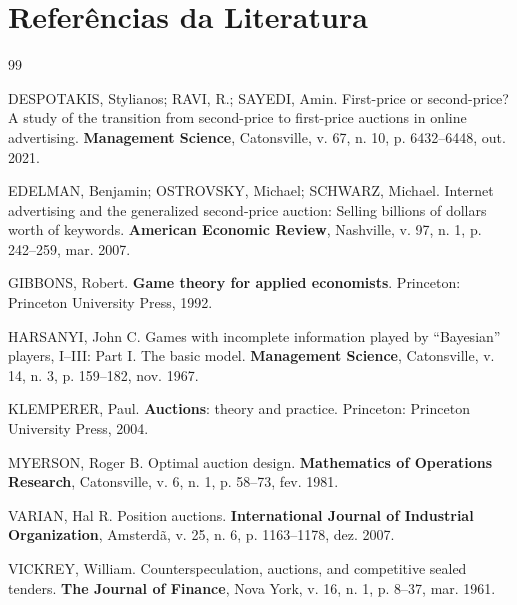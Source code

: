 \section{Referências da Literatura}
\label{sec:referencias}

\renewcommand{\refname}{}

\begin{thebibliography}{99}

DESPOTAKIS, Stylianos; RAVI, R.; SAYEDI, Amin. First-price or second-price? A study of the transition from second-price to first-price auctions in online advertising. \textbf{Management Science}, Catonsville, v. 67, n. 10, p. 6432--6448, out. 2021.

EDELMAN, Benjamin; OSTROVSKY, Michael; SCHWARZ, Michael. Internet advertising and the generalized second-price auction: Selling billions of dollars worth of keywords. \textbf{American Economic Review}, Nashville, v. 97, n. 1, p. 242--259, mar. 2007.

GIBBONS, Robert. \textbf{Game theory for applied economists}. Princeton: Princeton University Press, 1992.

HARSANYI, John C. Games with incomplete information played by ``Bayesian'' players, I--III: Part I. The basic model. \textbf{Management Science}, Catonsville, v. 14, n. 3, p. 159--182, nov. 1967.

KLEMPERER, Paul. \textbf{Auctions}: theory and practice. Princeton: Princeton University Press, 2004.

MYERSON, Roger B. Optimal auction design. \textbf{Mathematics of Operations Research}, Catonsville, v. 6, n. 1, p. 58--73, fev. 1981.

VARIAN, Hal R. Position auctions. \textbf{International Journal of Industrial Organization}, Amsterdã, v. 25, n. 6, p. 1163--1178, dez. 2007.

VICKREY, William. Counterspeculation, auctions, and competitive sealed tenders. \textbf{The Journal of Finance}, Nova York, v. 16, n. 1, p. 8--37, mar. 1961.

\end{thebibliography}
